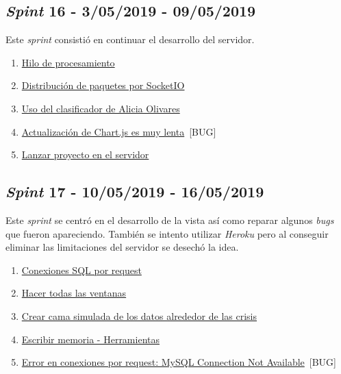 \subsection{\textit{Spint} 16 - 3/05/2019 - 09/05/2019}
Este \textit{sprint} consistió en continuar el desarrollo del servidor.

\begin{enumerate}\addtocounter{enumi}{73}
	\item 
	\href{https://github.com/jlgarridol/TFG-SmartBeds/issues/74}{Hilo de procesamiento}
	\item 
	\href{https://github.com/jlgarridol/TFG-SmartBeds/issues/75}{Distribución de paquetes por SocketIO}
	\item 
	\href{https://github.com/jlgarridol/TFG-SmartBeds/issues/76}{Uso del clasificador de Alicia Olivares}
	\item 
	\href{https://github.com/jlgarridol/TFG-SmartBeds/issues/77}{Actualización de Chart.js es muy lenta}~[BUG]
	\item 
	\href{https://github.com/jlgarridol/TFG-SmartBeds/issues/78}{Lanzar proyecto en el servidor}
\end{enumerate}

\subsection{\textit{Spint} 17 - 10/05/2019 - 16/05/2019}
Este \textit{sprint} se centró en el desarrollo de la vista así como reparar algunos \textit{bugs} que fueron apareciendo. También se intento utilizar \textit{Heroku} pero al conseguir eliminar las limitaciones del servidor se desechó la idea.

\begin{enumerate}\addtocounter{enumi}{79}
	\item 
	\href{https://github.com/jlgarridol/TFG-SmartBeds/issues/80}{Conexiones SQL por request}
	\item 
	\href{https://github.com/jlgarridol/TFG-SmartBeds/issues/81}{Hacer todas las ventanas}
	\item 
	\href{https://github.com/jlgarridol/TFG-SmartBeds/issues/82}{Crear cama simulada de los datos alrededor de las crisis}
	\item 
	\href{https://github.com/jlgarridol/TFG-SmartBeds/issues/83}{Escribir memoria - Herramientas}
	\item 
	\href{https://github.com/jlgarridol/TFG-SmartBeds/issues/84}{Error en conexiones por request: MySQL Connection Not Available}~[BUG]
\end{enumerate}


